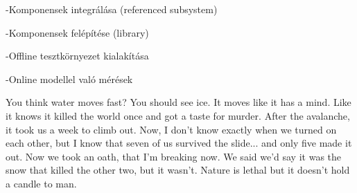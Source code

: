 -Komponensek integrálása (referenced subsystem)

-Komponensek felépítése (library)

-Offline tesztkörnyezet kialakítása

-Online modellel való mérések




You think water moves fast? You should see ice. It moves like it has a mind. Like it knows it killed the world once and got a taste for murder. After the avalanche, it took us a week to climb out. Now, I don't know exactly when we turned on each other, but I know that seven of us survived the slide... and only five made it out. Now we took an oath, that I'm breaking now. We said we'd say it was the snow that killed the other two, but it wasn't. Nature is lethal but it doesn't hold a candle to man.


%
%



%
%



